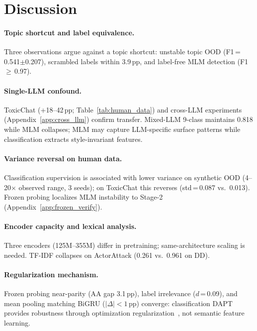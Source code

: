 
\section{Discussion}
\label{sec:discussion}

\paragraph{Topic shortcut and label equivalence.}
Three observations argue against a topic shortcut: unstable topic OOD (F1\,=\,0.541$\pm$0.207), scrambled labels within 3.9\,pp, and label-free MLM detection (F1\,$\geq$\,0.97).

\paragraph{Single-LLM confound.}
ToxicChat (+18--42\,pp; Table~\ref{tab:human_data}) and cross-LLM experiments (Appendix~\ref{app:cross_llm}) confirm transfer. Mixed-LLM 9-class maintains 0.818 while MLM collapses; MLM may capture LLM-specific surface patterns while classification extracts style-invariant features.

\paragraph{Variance reversal on human data.}
Classification supervision is associated with lower variance on synthetic OOD (4--20$\times$ observed range, 3 seeds); on ToxicChat this reverses (std\,=\,0.087 vs.\ 0.013). Frozen probing localizes MLM instability to Stage-2 (Appendix~\ref{app:frozen_verify}).

\paragraph{Encoder capacity and lexical analysis.}
Three encoders (125M--355M) differ in pretraining; same-architecture scaling is needed. TF-IDF collapses on ActorAttack (0.261 vs.\ 0.961 on DD).

\paragraph{Regularization mechanism.}
Frozen probing near-parity (AA gap 3.1\,pp), label irrelevance ($d$\,=\,0.09), and mean pooling matching BiGRU ($|\Delta| < 1$\,pp) converge: classification DAPT provides robustness through optimization regularization~\citep{chen2020simclr,grill2020byol}, not semantic feature learning.

